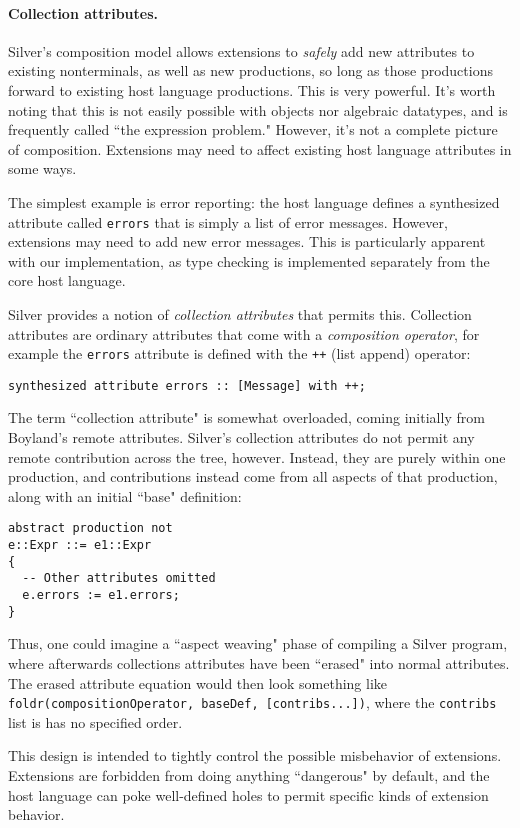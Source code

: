 \paragraph{Collection attributes.}
Silver's composition model allows extensions to \textit{safely} add new attributes
to existing nonterminals, as well as new productions, so long as those productions forward
to existing host language productions.
%
This is very powerful.
%
It's worth noting that this is not easily possible
with objects nor algebraic datatypes, and is frequently called ``the expression
problem."
%
However, it's not a complete picture of composition.
%
Extensions may need to affect existing host language attributes in some ways.

The simplest example is error reporting: the host language defines a synthesized
attribute called \texttt{errors} that is simply a list of error messages.
%
However, extensions may need to add new error messages.
%
This is particularly apparent with our implementation, as type checking is
implemented separately from the core host language.

Silver provides a notion of \textit{collection attributes} that permits this.
%
Collection attributes are ordinary attributes that come with a
\textit{composition operator}, for example the \texttt{errors} attribute
is defined with the \texttt{++} (list append) operator:
%
\begin{verbatim}
synthesized attribute errors :: [Message] with ++;
\end{verbatim}
%
The term ``collection attribute" is somewhat overloaded, coming initially
from Boyland's remote attributes\cite{boyland05}.
%
Silver's collection attributes do not permit any remote contribution across
the tree, however.
%
Instead, they are purely within one production, and contributions instead come
from all aspects of that production, along with an initial ``base" definition:
\begin{verbatim}
abstract production not
e::Expr ::= e1::Expr
{
  -- Other attributes omitted
  e.errors := e1.errors;
}
\end{verbatim}
%
Thus, one could imagine a ``aspect weaving" phase of compiling a Silver
program, where afterwards collections attributes have been ``erased" into
normal attributes.
%
The erased attribute equation would then look something like
\texttt{foldr(compositionOperator, baseDef, [contribs...])},
where the \texttt{contribs} list is has no specified order.

This design is intended to tightly control the possible misbehavior of
extensions.
%
Extensions are forbidden from doing anything ``dangerous" by default,
and the host language can poke well-defined holes to permit specific
kinds of extension behavior.


